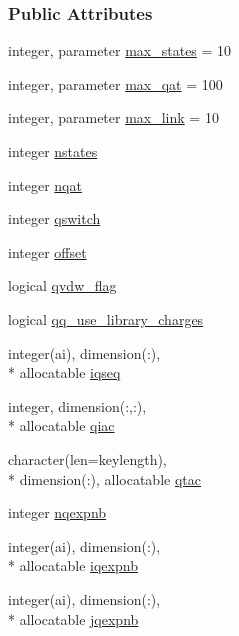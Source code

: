 \subsubsection*{Public Attributes}
\begin{DoxyCompactItemize}
\item 
integer, parameter \hyperlink{classqatom_ad89179e7bcdef29e13211330d1b8fd20}{max\-\_\-states} = 10
\item 
integer, parameter \hyperlink{classqatom_aed28407cee717496e5e81de3a1768577}{max\-\_\-qat} = 100
\item 
integer, parameter \hyperlink{classqatom_a9ffa057551e3d0e26b8055ea44231d33}{max\-\_\-link} = 10
\item 
integer \hyperlink{classqatom_ab24f0d8ce5d78bc90af82d3f9d155b3f}{nstates}
\item 
integer \hyperlink{classqatom_a15d48d2e096025002da510e477603e61}{nqat}
\item 
integer \hyperlink{classqatom_a3e50342ab7867b2480379e7b998bc882}{qswitch}
\item 
integer \hyperlink{classqatom_abb91d88c31c0e0523c8d566cc351f656}{offset}
\item 
logical \hyperlink{classqatom_ae27d6b6c13977933ac2f66796ae54de9}{qvdw\-\_\-flag}
\item 
logical \hyperlink{classqatom_af0b20b09ab7e5b34ab609d49ebccba3a}{qq\-\_\-use\-\_\-library\-\_\-charges}
\item 
integer(ai), dimension(\-:), \\*
allocatable \hyperlink{classqatom_abb14d4ee8a5fb947e6552af656fbe0e7}{iqseq}
\item 
integer, dimension(\-:,\-:), \\*
allocatable \hyperlink{classqatom_a98b6c947f4fc7a3f0eb6d5c3120def21}{qiac}
\item 
character(len=keylength), \\*
dimension(\-:), allocatable \hyperlink{classqatom_a6762a3f40177cdb6f7c42c0a4918b61c}{qtac}
\item 
integer \hyperlink{classqatom_aee32251394714177be381e83d6eb066a}{nqexpnb}
\item 
integer(ai), dimension(\-:), \\*
allocatable \hyperlink{classqatom_aa99790e204a2a46a0e30dcc5c7db2ff6}{iqexpnb}
\item 
integer(ai), dimension(\-:), \\*
allocatable \hyperlink{classqatom_a7d7c0be138a07450adc6f97ff114f3e9}{jqexpnb}
\item 

\end{DoxyCompactItemize}

